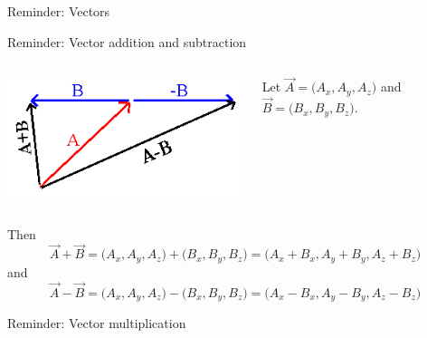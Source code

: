 {\begin{frame}[t]{Reminder: Vectors}
\end{frame}

%
%
%

\begin{frame}{Reminder: Vector addition and subtraction}

\begin{columns}
  \begin{column}{0.30\textwidth}
   \begin{center}
     \includegraphics[width=0.98\textwidth]{./images/schematics/vector_addition_and_subtraction_1.png}\\
   \end{center}
  \end{column}
  \begin{column}{0.70\textwidth}
     Let $\vec{A} = \Big( A_x, A_y, A_z \Big)$ and $\vec{B} = \Big( B_x, B_y, B_z \Big)$.\\
  \end{column}
\end{columns}

\vspace{0.3cm}

Then
\begin{equation*}
    \vec{A} + \vec{B} =
    \Big( A_x, A_y, A_z \Big) + \Big( B_x, B_y, B_z \Big) =
    \Big( A_x + B_x, A_y + B_y, A_z + B_z \Big)
\end{equation*}
and
\begin{equation*}
    \vec{A} - \vec{B} =
    \Big( A_x, A_y, A_z \Big) - \Big( B_x, B_y, B_z \Big) =
    \Big( A_x - B_x, A_y - B_y, A_z - B_z \Big)
\end{equation*}

\end{frame}

%
%
%

\begin{frame}{Reminder: Vector multiplication}


\end{frame}}
